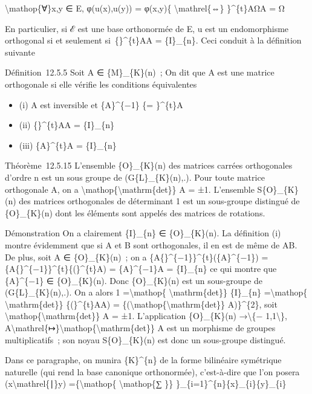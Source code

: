\documentclass[]{article}
\begin{document}
\textbackslash{}mathop\{∀\}x,y ∈ E, φ(u(x),u(y)) = φ(x,y)\{
\textbackslash{}mathrel\{⇔\} \}\^{}\{t\}AΩA = Ω

En particulier, si ℰ est une base orthonormée de E, u est un
endomorphisme orthogonal si et seulement si~\{\}\^{}\{t\}AA =
\{I\}\_\{n\}. Ceci conduit à la définition suivante

Définition~12.5.5 Soit A ∈ \{M\}\_\{K\}(n)~; On dit que A est une
matrice orthogonale si elle vérifie les conditions équivalentes

\begin{itemize}
\itemsep1pt\parskip0pt
\item
  (i) A est inversible et \{A\}\^{}\{−1\} \{= \}\^{}\{t\}A
\item
  (ii) \{\}\^{}\{t\}AA = \{I\}\_\{n\}
\item
  (iii) \{A\}\^{}\{t\}A = \{I\}\_\{n\}
\end{itemize}

Théorème~12.5.15 L'ensemble \{O\}\_\{K\}(n) des matrices carrées
orthogonales d'ordre n est un sous groupe de (G\{L\}\_\{K\}(n),.). Pour
toute matrice orthogonale A, on a
\textbackslash{}mathop\{\textbackslash{}mathrm\{det\}\} A = ±1.
L'ensemble S\{O\}\_\{K\}(n) des matrices orthogonales de déterminant 1
est un sous-groupe distingué de \{O\}\_\{K\}(n) dont les éléments sont
appelés des matrices de rotations.

Démonstration On a clairement \{I\}\_\{n\} ∈ \{O\}\_\{K\}(n). La
définition (i) montre évidemment que si A et B sont orthogonales, il en
est de même de AB. De plus, soit A ∈ \{O\}\_\{K\}(n)~; on a
\{A\{\}\^{}\{−1\}\}\^{}\{t\}(\{A\}\^{}\{−1\}) =
\{A\{\}\^{}\{−1\}\}\^{}\{t\}\{(\}\^{}\{t\}A) = \{A\}\^{}\{−1\}A =
\{I\}\_\{n\} ce qui montre que \{A\}\^{}\{−1\} ∈ \{O\}\_\{K\}(n). Donc
\{O\}\_\{K\}(n) est un sous-groupe de (G\{L\}\_\{K\}(n),.). On a alors 1
=\textbackslash{}mathop\{ \textbackslash{}mathrm\{det\}\} \{I\}\_\{n\}
=\textbackslash{}mathop\{ \textbackslash{}mathrm\{det\}\}
\{(\}\^{}\{t\}AA) =
\{(\textbackslash{}mathop\{\textbackslash{}mathrm\{det\}\}
A)\}\^{}\{2\}, soit
\textbackslash{}mathop\{\textbackslash{}mathrm\{det\}\} A = ±1.
L'application \{O\}\_\{K\}(n) →\textbackslash{}\{−
1,1\textbackslash{}\},
A\textbackslash{}mathrel\{↦\}\textbackslash{}mathop\{\textbackslash{}mathrm\{det\}\}
A est un morphisme de groupes multiplicatifs~; son noyau
S\{O\}\_\{K\}(n) est donc un sous-groupe distingué.

Dans ce paragraphe, on munira \{K\}\^{}\{n\} de la forme bilinéaire
symétrique naturelle (qui rend la base canonique orthonormée),
c'est-à-dire que l'on posera (x\textbackslash{}mathrel\{∣\}y)
=\{\textbackslash{}mathop\{ \textbackslash{}mathop\{∑ \}\}
\}\_\{i=1\}\^{}\{n\}\{x\}\_\{i\}\{y\}\_\{i\}
\end{document}
